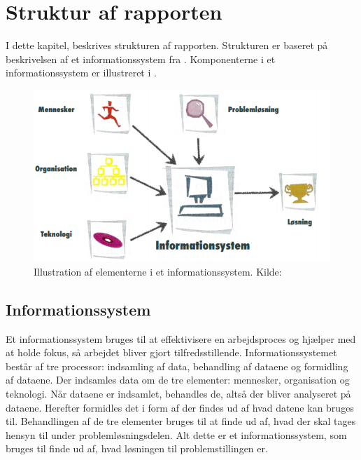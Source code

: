 \chapter{Struktur af rapporten}\label{chap:struktur-af-problemanalyse}

I dette kapitel, beskrives strukturen af rapporten. Strukturen er baseret på beskrivelsen af et
informationssystem fra \citet{Laudon1999}. Komponenterne i et informationssystem er illustreret i
.

\begin{figure}[htbp]
  \centering
  \includegraphics{images/kontekstmodel/metode.png}
  \caption[Metode for Kontekstmodellen]{Illustration af elementerne i et informationssystem. Kilde:
  \protect\citet{Laudon1999}}
  \label{fig:kontekstmodel}
\end{figure}


\section{Informationssystem}\label{Informationssystem}

Et informationssystem bruges til at effektivisere en arbejdsproces og hjælper med at holde fokus, så arbejdet
bliver gjort tilfredsstillende. Informationssystemet består af tre processor: indsamling af data, behandling
af dataene og formidling af dataene. Der indsamles data om de tre elementer: mennesker, organisation og
teknologi. Når dataene er indsamlet, behandles de, altså der bliver analyseret på dataene. Herefter formidles
det i form af der findes ud af hvad datene kan bruges til. Behandlingen af de tre elementer bruges til at
finde ud af, hvad der skal tages hensyn til under problemløsningsdelen. Alt dette er et informationssystem,
som bruges til finde ud af, hvad løsningen til problemstillingen er.


